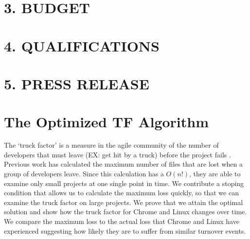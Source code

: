 \documentclass[11pt, a4paper, openright]{report}
\begin{document}
\section* {3. BUDGET}


\section* {4. QUALIFICATIONS}


\section* {5. PRESS RELEASE}





\backmatter

%




\appendix
\newpage
\section*{The Optimized TF Algorithm}
The `truck factor' is a measure in the agile community of the number of developers that must leave (EX: get hit by a truck) before the project fails \cite{Torchiano2011Wetsom}. Previous work has calculated the maximum number of files
that are lost when a group of developers leave. Since this calculation has a
$O(n!)$, they are able to examine only small projects at one single point in time.
We contribute a stoping condition that allows us to calculate the maximum loss
quickly, so that we can examine the truck factor on large projects. We prove
that we attain the optimal solution and show how the truck factor for Chrome and
Linux changes over time. We compare the maximum loss to the actual loss that
Chrome and Linux have experienced suggesting how likely they are to suffer from
similar turnover events.
\end{document}
